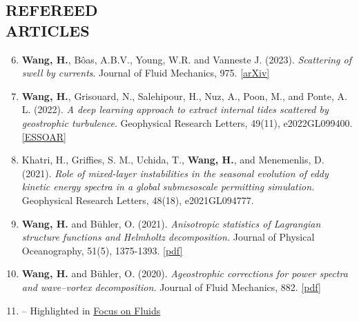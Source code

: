 \documentclass[margin]{res}
\newenvironment{benumerate}[1]{
    \let\oldItem\item
    \def\item{\addtocounter{enumi}{-2}\oldItem}
    \begin{enumerate}[leftmargin=*,noitemsep]
    \setcounter{enumi}{#1}
    \addtocounter{enumi}{1}
}{
    \end{enumerate}
}
\begin{document}
\begin{resume}


\section{{\normalfont REFEREED\\ARTICLES}}
\begin{benumerate}{5}
\item \textbf{Wang, H.}, B\^{o}as, A.B.V., Young, W.R. and Vanneste J. (2023). \textit{Scattering of swell by currents}. Journal of Fluid Mechanics, 975.  \href{https://arxiv.org/abs/2305.12163}{[arXiv]}
\item \textbf{Wang, H.}, Grisouard, N., Salehipour, H., Nuz, A., Poon, M., and Ponte, A. L. (2022). \textit{A deep learning approach to extract internal tides scattered by geostrophic turbulence}. Geophysical Research Letters, 49(11), e2022GL099400. \href{https://essopenarchive.org/doi/full/10.1002/essoar.10508849.2}{[ESSOAR]}
\item Khatri, H., Griffies, S. M., Uchida, T., \textbf{Wang, H.},  and Menemenlis, D. (2021). \textit{Role of mixed-layer instabilities in the seasonal evolution of eddy kinetic energy spectra in a global submesoscale permitting simulation.} Geophysical Research Letters, 48(18), e2021GL094777.
\item \textbf{Wang, H.} and B{\"u}hler, O. (2021). \textit{Anisotropic statistics of Lagrangian structure functions and Helmholtz decomposition.} Journal of Physical Oceanography, 51(5), 1375-1393. \href{https://hannnwang.github.io/WangBuhlerJPO21}{[pdf]}
\item \textbf{Wang, H.} and B{\"u}hler, O. (2020). \textit{Ageostrophic corrections for power spectra and wave–vortex decomposition.} Journal of Fluid Mechanics, 882. \href{https://hannnwang.github.io/AgeoSpectraJFM20}{[pdf]}
\item[] -- Highlighted in \href{https://www.cambridge.org/core/journals/journal-of-fluid-mechanics/article/untangling-waves-and-vortices-in-the-atmospheric-kinetic-energy-spectra/1BEB1ABC32CD2CFAB99BAFEE4712CD0C}{Focus on Fluids}
\end{benumerate}


\end{resume}
\end{document}
